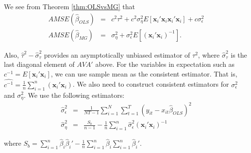 We see from Theorem \ref{thm:OLSvsMG} that 
\begin{eqnarray}
  AMSE(\widehat{\beta}_{OLS}) &=& c^2 \tau^2 + c^2 \sigma_\eta^2 E[\mathbf{x}_i'\mathbf{x}_i \mathbf{x}_i' \mathbf{x}_i] +  c \sigma_\epsilon^2   \\
  \label{eq:OLSAMSE}
  AMSE(\widehat{\beta}_{MG}) &=& \sigma_\eta^2    + \sigma_\epsilon^2 E[(\mathbf{x}_i'\mathbf{x}_i)^{-1}]
  \label{eq:MGAMSE}.
\end{eqnarray}

Also, $\widehat{\tau}^2 - \widehat{\sigma}_\tau^2$ provides an asymptotically unbiased estimator of $\tau^2$, where $\widehat{\sigma}_\tau^2$ is the last diagonal element of $AVA'$ above. 
For the variables in expectation such as $c^{-1} = E[\mathbf{x}_i'\mathbf{x}_i]$, we can use sample mean as the consistent estimator. That is, $\widehat{c^{-1}} =  \frac{1}{n} \sum_{i=1}^n (\mathbf{x}_i'\mathbf{x}_i) $. We also need to construct consistent estimators for $\sigma_\epsilon^2$ and $\sigma_\eta^2$. We use the following estimators:
\begin{eqnarray}
\widehat{\sigma}_\epsilon^2 &=& \frac{1}{NT - 1} \sum_{i=1}^N \sum_{t=1}^T (y_{it}-x_{it}\widehat{\beta}_{OLS})^2\\
\widehat{\sigma}_\eta^2 &=& \frac{S_b}{n-1} -\frac{1}{n} \sum_{i=1}^n \widehat{\sigma}_\epsilon^2 (\mathbf{x}_i'\mathbf{x}_i)^{-1} 
\end{eqnarray}

where $S_b = \sum_{i=1}^n \widehat{\beta}_i \widehat{\beta}_i' - \frac{1}{n} \sum_{i=1}^n \widehat{\beta}_i \sum_{i=1}^n \widehat{\beta}_i'$. 

